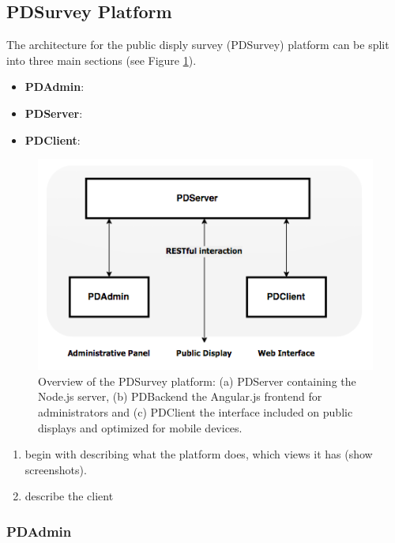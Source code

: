 

\subsection{PDSurvey Platform}

	The architecture for the public disply survey (PDSurvey) platform can be split into three main sections (see Figure \ref{fig:4-pdsurvey-platform}). 

	\begin{itemize}
	\item \textbf{PDAdmin}: 
	\item \textbf{PDServer}: 
	\item \textbf{PDClient}:
	\end{itemize}

	\begin{figure}%
	    \begin{center}
	        \includegraphics[width=.7\columnwidth]{img/4_implementation/4-overview}
	    \end{center}
	 \caption[Overview of the PDSurvey platform]{Overview of the PDSurvey platform: (a) PDServer containing the Node.js server, (b) PDBackend the Angular.js frontend for administrators and (c) PDClient the interface included on public displays and optimized for mobile devices.}
	 \label{fig:4-pdsurvey-platform}
	\end{figure}



	\begin{enumerate}
	\item begin with describing what the platform does, which views it has (show screenshots).
	\item describe the client
	\end{enumerate}



	\subsubsection{PDAdmin}

